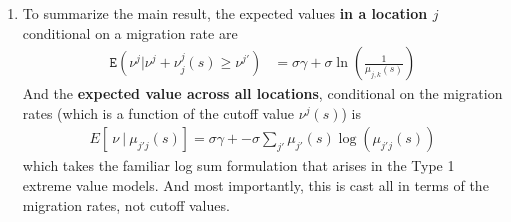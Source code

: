 \documentclass[pdftex,11pt]{article}
\begin{document}
\begin{enumerate}
\item To summarize the main result, the expected values \textbf{in a location $j$} conditional on a migration rate are
\begin{align}
\mathtt{E}(\nu^{j} | \nu^{j} + \nu_{j}^{j}(s) \geq \nu^{j'}) &= \sigma \gamma + \sigma \ln \left( \frac{1}{\mu_{j,k}(s)} \right)
\end{align}
And the \textbf{expected value across all locations}, conditional on the migration rates (which is a function of the cutoff value $\nu^{j}(s)$) is
\begin{align}
E[\ \nu \ | \ \mu_{j'j}(s)] = \sigma \gamma + -\sigma \sum_{j'} \mu_{j'}(s) \log \left( \mu_{j'j}(s) \right)
\end{align}
which takes the familiar log sum formulation that arises in the Type 1 extreme value models. And most importantly, this is cast all in terms of the migration rates, not cutoff values.
\end{enumerate}
\end{document}
